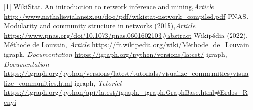 \documentclass[frenchb]{report}
\newcommand{\1}{\mathbbm{1}}
\theoremstyle{definition}\newtheorem{defn}{Définition}
\theoremstyle{definition}\newtheorem{exm}{Exemple}
\theoremstyle{definition}\newtheorem{nota}{Notation}
\theoremstyle{definition}\newtheorem{rem}{Remarque}
\begin{document}

[1] WikiStat. An introduction to network inference and mining,\textit{Article}\newline
\url{http://www.nathalievialaneix.eu/doc/pdf/wikistat-network_compiled.pdf}\newline
\break
[2] PNAS. Modularity and community structure in networks (2015),\textit{Article}\newline
\url{https://www.pnas.org/doi/10.1073/pnas.0601602103#abstract} \newline
\break
[3] Wikipédia (2022). Méthode de Louvain, \textit{Article}\newline
\url{https://fr.wikipedia.org/wiki/Méthode_de_Louvain} \newline
\break
[4] igraph, \textit{Documentation}\newline
\url{https://igraph.org/python/versions/latest/}\newline
\break
[5] igraph, \textit{Documentation}\newline
\url{https://igraph.org/python/versions/latest/tutorials/visualize_communities/visualize_communities.html}
\break
[6] igraph, \textit{Tutoriel}\newline
\url{https://igraph.org/python/api/latest/igraph._igraph.GraphBase.html#Erdos_Renyi}
\end{document}
